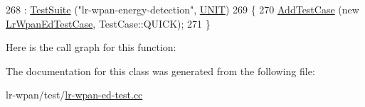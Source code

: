 \begin{DoxyCode}
268   : \hyperlink{classns3_1_1TestSuite_a904b0c40583b744d30908aeb94636d1a}{TestSuite} (\textcolor{stringliteral}{"lr-wpan-energy-detection"}, \hyperlink{classns3_1_1TestSuite_a1ebfcab34ec8161e085e8e3a1855eae0a3885375a3787abf60431f8454b3cadbd}{UNIT})
269 \{
270   \hyperlink{classns3_1_1TestCase_a3718088e3eefd5d6454569d2e0ddd835}{AddTestCase} (\textcolor{keyword}{new} \hyperlink{classLrWpanEdTestCase}{LrWpanEdTestCase}, TestCase::QUICK);
271 \}
\end{DoxyCode}


Here is the call graph for this function\+:




The documentation for this class was generated from the following file\+:\begin{DoxyCompactItemize}
\item 
lr-\/wpan/test/\hyperlink{lr-wpan-ed-test_8cc}{lr-\/wpan-\/ed-\/test.\+cc}\end{DoxyCompactItemize}
